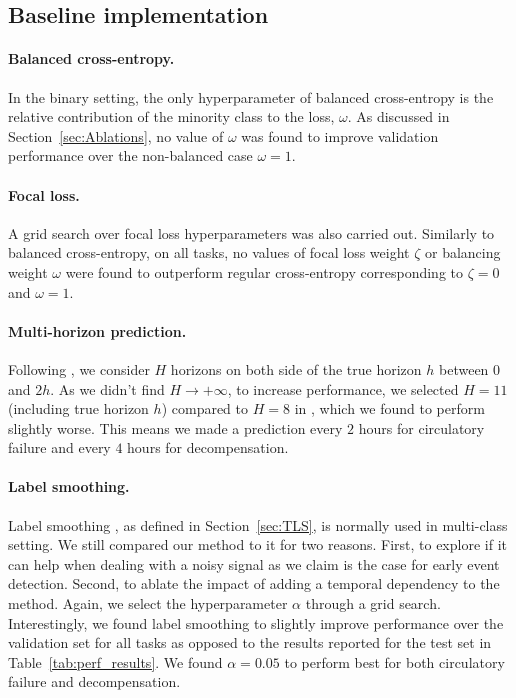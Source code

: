 \documentclass[nohyperref]{article}
\begin{document}
\subsection{Baseline implementation}


\paragraph{Balanced cross-entropy.}
In the binary setting, the only hyperparameter of balanced cross-entropy is the relative contribution of the minority class to the loss, $\omega$. As discussed in Section~\ref{sec:Ablations}, no value of $\omega$ was found to improve validation performance over the non-balanced case $\omega=1$.

\paragraph{Focal loss.}
A grid search over focal loss hyperparameters was also carried out.
Similarly to balanced cross-entropy, on all tasks, no values of focal loss weight $\zeta$ or balancing weight $\omega$ were found to outperform regular cross-entropy corresponding to $\zeta = 0 $ and $\omega=1$.

\paragraph{Multi-horizon prediction.} Following \citet{tomavsev2019}, we consider $H$ horizons on both side of the true horizon $h$ between $0$ and $2h$. As we didn't find $H \longrightarrow +\infty$, to increase performance, we selected $H = 11$ (including true horizon $h$) compared to $H = 8$ in \citet{tomavsev2019}, which we found to perform slightly worse. This means we made a prediction every $2$ hours for circulatory failure and every $4$ hours for {decompensation}. 

\paragraph{Label smoothing.} Label smoothing \citep{DBLP:conf/cvpr/SzegedyVISW16}, as defined in Section~\ref{sec:TLS}, is normally used in multi-class setting. We still compared our method to it for two reasons. First, to explore if it can help when dealing with a noisy signal as we claim is the case for early event detection. Second, to ablate the impact of adding a temporal dependency to the method. Again, we select the hyperparameter $\alpha$ through a grid search. Interestingly, we found label smoothing to slightly improve performance over the validation set for all tasks as opposed to the results reported for the test set in Table~\ref{tab:perf_results}. We found $\alpha = 0.05$ to perform best for both {circulatory failure} and {decompensation}.
\end{document}
